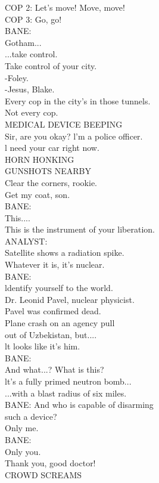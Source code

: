 \documentclass{article}
\begin{document}
\begin{multicols}{3}
COP 2: Let's move! Move, move!\\
COP 3: Go, go!\\
BANE:\\
Gotham...\\
...take control.\\
Take control of your city.\\
-Foley.\\
-Jesus, Blake.\\
Every cop in the city's in those tunnels.\\
Not every cop.\\
MEDICAL DEVICE BEEPING\\
Sir, are you okay? l'm a police officer.\\
l need your car right now.\\
HORN HONKING\\
GUNSHOTS NEARBY\\
Clear the corners, rookie.\\
Get my coat, son.\\
BANE:\\
This....\\
This is the instrument of your liberation.\\
ANALYST:\\
Satellite shows a radiation spike.\\
Whatever it is, it's nuclear.\\
BANE:\\
ldentify yourself to the world.\\
Dr. Leonid Pavel, nuclear physicist.\\
Pavel was confirmed dead.\\
Plane crash on an agency pull\\
out of Uzbekistan, but....\\
lt looks like it's him.\\
BANE:\\
And what...? What is this?\\
lt's a fully primed neutron bomb...\\
...with a blast radius of six miles.\\
BANE: And who is capable of disarming\\
such a device?\\
Only me.\\
BANE:\\
Only you.\\
Thank you, good doctor!\\
CROWD SCREAMS\\

\end{multicols}
\end{document}
